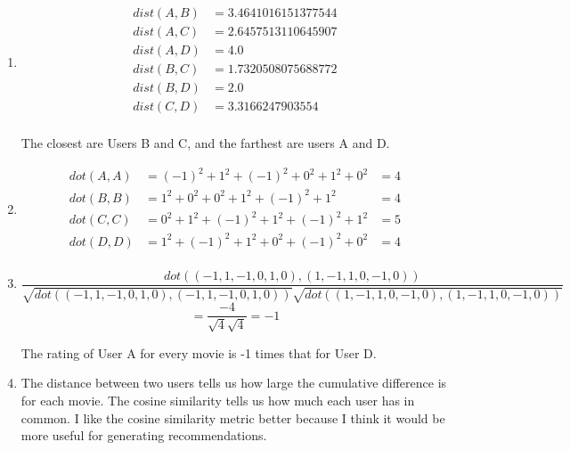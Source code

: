 \documentclass{article}
\begin{document}
\begin{enumerate}
	      \begin{enumerate}
		      \item
		            \begin{align*}
			            dist(A, B) & = 3.4641016151377544 \\
			            dist(A, C) & = 2.6457513110645907 \\
			            dist(A, D) & = 4.0                \\
			            dist(B, C) & = 1.7320508075688772 \\
			            dist(B, D) & = 2.0                \\
			            dist(C, D) & = 3.3166247903554    \\
		            \end{align*}

		            The closest are Users B and C, and the farthest are users A and D.

		      \item
		            \begin{align*}
			            dot(A, A) & = (-1)^2 + 1^2 + (-1)^2 + 0^2 + 1^2 + 0^2 & = 4 \\
			            dot(B, B) & = 1^2 + 0^2 + 0^2 + 1^2 + (-1)^2 + 1^2    & = 4 \\
			            dot(C, C) & = 0^2 + 1^2 + (-1)^2 + 1^2 + (-1)^2 + 1^2 & = 5 \\
			            dot(D, D) & = 1^2 + (-1)^2 + 1^2 + 0^2 + (-1)^2 + 0^2 & = 4 \\
		            \end{align*}

		      \item
		            $$
			            \frac{dot((-1,1,-1,0,1,0), (1,-1,1,0,-1,0))}{
				            \sqrt{dot((-1,1,-1,0,1,0), (-1,1,-1,0,1,0))}
				            \sqrt{dot((1,-1,1,0,-1,0), (1,-1,1,0,-1,0))}
			            }
		            $$
		            $$
			            = \frac{-4}{\sqrt{4}\sqrt{4}} = -1
		            $$

		            The rating of User A for every movie is -1 times that for User D.

		      \item
		            The distance between two users tells us how large the cumulative difference
		            is for each movie. The cosine similarity tells us how much each user
		            has in common. I like the cosine similarity metric better because I think
		            it would be more useful for generating recommendations.


\end{enumerate}
\end{enumerate}
\end{document}
